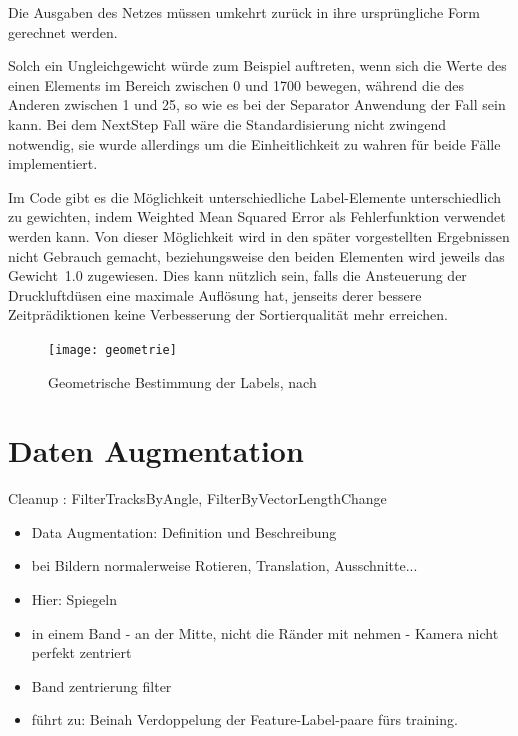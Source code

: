 Die Ausgaben des Netzes müssen umkehrt zurück in ihre ursprüngliche Form gerechnet werden.

Solch ein Ungleichgewicht würde zum Beispiel auftreten, wenn sich die Werte des einen Elements im Bereich zwischen 0 und 1700 bewegen, während die des Anderen zwischen 1 und 25,
so wie es bei der Separator Anwendung der Fall sein kann.   
Bei dem NextStep Fall wäre die Standardisierung nicht zwingend notwendig, 
sie wurde allerdings um die Einheitlichkeit zu wahren für beide Fälle implementiert. 


Im Code gibt es die Möglichkeit unterschiedliche Label-Elemente unterschiedlich zu gewichten, indem Weighted Mean Squared Error als Fehlerfunktion verwendet werden kann. 
Von dieser Möglichkeit wird in den später vorgestellten Ergebnissen nicht Gebrauch gemacht, beziehungsweise den beiden Elementen wird jeweils das Gewicht~1.0 zugewiesen.
Dies kann nützlich sein, falls die Ansteuerung der Druckluftdüsen eine maximale Auflösung hat, jenseits derer bessere Zeitprädiktionen keine Verbesserung der Sortierqualität mehr erreichen.

\begin{figure}[h]
	\centering
	\texttt{[image: geometrie]}
	\caption{Geometrische Bestimmung der Labels, nach \cite{Pfaff2018}}
	\label{fig:Schnittpunkt}
\end{figure}






\section{Daten Augmentation}

\color{blue}

Cleanup : FilterTracksByAngle, FilterByVectorLengthChange 

\begin{itemize}
	\item Data Augmentation: Definition und Beschreibung
	\item bei Bildern normalerweise Rotieren, Translation, Ausschnitte...
	\item Hier: Spiegeln
	\item in einem Band - an der Mitte, nicht die Ränder mit nehmen - Kamera nicht perfekt zentriert
	\item Band zentrierung filter
	\item führt zu: Beinah Verdoppelung der Feature-Label-paare fürs training.
\end{itemize}
\color{black}

